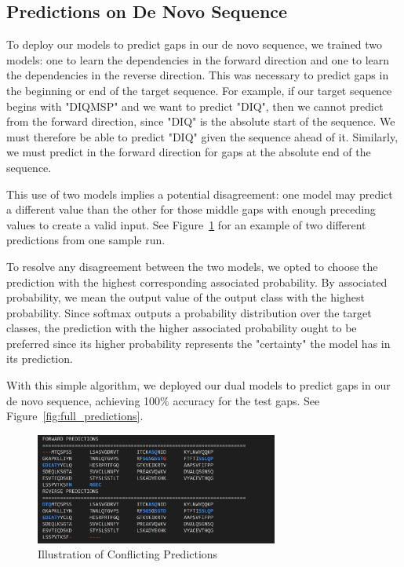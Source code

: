 \documentclass[journal]{IEEEtran}
\begin{document}
  \subsection{Predictions on De Novo Sequence}
    To deploy our models to predict gaps in our de novo sequence, 
    we trained two models: one to learn the dependencies in the forward direction and
    one to learn the dependencies in the reverse direction. This was necessary to predict 
    gaps in the beginning or end of the target sequence. 
    For example, if our target sequence begins with "DIQMSP" and we want to predict "DIQ", then
    we cannot predict from the forward direction, since "DIQ" is the absolute start of 
    the sequence. We must therefore be able to predict "DIQ" given the sequence
    ahead of it. Similarly, we must predict in the forward direction for gaps at the absolute end of the sequence.

    This use of two models implies a potential disagreement: one model may predict
    a different value than the other for those middle gaps with enough
    preceding values to create a valid input. See Figure~\ref{fig:forward_reverse_predictions}
    for an example of two different predictions from one sample run.
    
    To resolve any disagreement between the two models, 
    we opted to choose the prediction with the highest corresponding associated
    probability. By associated probability, we mean the output value
    of the output class with the highest probability.
    Since softmax outputs a probability distribution over the target classes,
    the prediction with the higher associated probability ought to be 
    preferred since its higher probability represents the "certainty"
    the model has in its prediction. 

    With this simple algorithm, we deployed our dual models to predict
    gaps in our de novo sequence, achieving 100\% accuracy for the test gaps.
    See Figure~\ref{fig:full_predictions}.

    \begin{figure}[h]
      \centering
      \includegraphics[width=8cm]{figures/forward_reverse_predictions.png}
      \caption{Illustration of Conflicting Predictions}
      \label{fig:forward_reverse_predictions}
    \end{figure}
\end{document}
